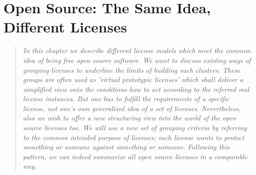 %
%
%
%
%

\chapter{Open Source: The Same Idea, Different Licenses}\label{sec:LicenseTaxonomies}

\footnotesize \begin{quote}\itshape In this chapter we describe different
license models which meet the common idea of being free open source
software. We want to discuss existing ways of grouping licenses to underline the
limits of building such clusters: These groups are often used as 'virtual
prototypic licenses' which shall deliver a simplified view onto the conditions
how to act according to the referred real license instances. But one has to
fulfill the requirements of a specific license, not one's own generalized idea
of a set of licenses. Nevertheless, also we wish to offer a new structuring view
into the world of the open source licenses too. We will use a new set of
grouping criteria by referring to the common intended purpose of licenses:
each license wants to protect something or someone against something or someone.
Following this pattern, we can indeed summarize all open source licenses in a
comparable way.
\end{quote}
\normalsize{}

